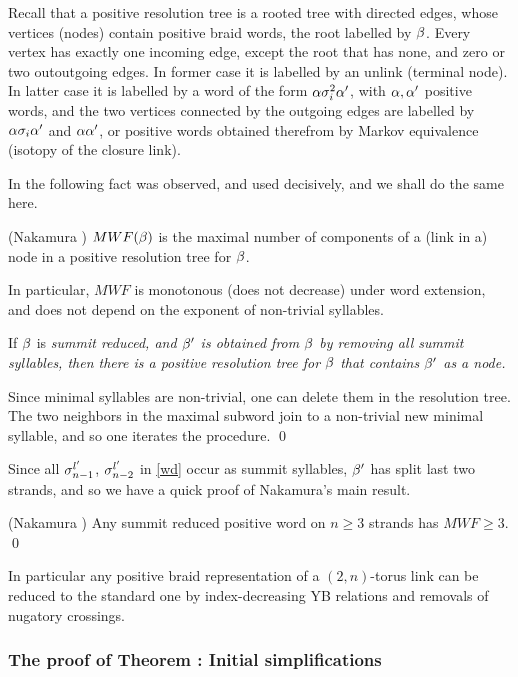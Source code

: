 Recall that a positive resolution tree is a rooted tree with directed 
edges,
whose vertices (nodes) contain positive braid words, the root labelled
by $\beta$. Every vertex has exactly one incoming edge, except the
root that has none, and zero or two outoutgoing edges. In former
case it is labelled by an unlink (terminal node).
In latter case it is labelled by
a word of the form $\alpha\sigma_i^2\alpha'$, with $\alpha,\alpha'$ positive
words, and the two vertices connected by the outgoing edges 
are labelled by $\alpha\sigma_i\alpha'$ and $\alpha\alpha'$, or positive words
obtained therefrom by Markov equivalence (isotopy of the closure link).

In \cite{Nakamura} the following fact was observed, and used
decisively, and we shall do the same here.

\begin{theorem}(Nakamura \cite{Nakamura})
$MWF(\beta)$ is the maximal number of components of a (link in a) node
in a positive resolution tree for $\beta$.
\end{theorem}

In particular, $MWF$ is monotonous (does not decrease) under word
extension, and does not depend on the exponent of non-trivial
syllables.

\begin{lemma}\label{lemh}
If $\beta$ is \em{summit reduced}, and $\beta'$ is obtained from $\beta$
by removing all summit syllables, then there is a positive resolution
tree for $\beta$ that contains $\beta'$ as a node.
\end{lemma}

\proof Since minimal syllables are non-trivial, one can delete them
in the resolution tree. The two neighbors in the maximal subword
join to a non-trivial new minimal syllable, and so one iterates the
procedure. \qed

Since all $\sigma_{n-1}^{l'}$, $\sigma_{n-2}^{l'}$ in \eqref{wd} occur as
summit syllables, $\beta'$ has split last two strands, and so we have
a quick proof of Nakamura's main result.

\begin{corr}(Nakamura \cite{Nakamura})
Any summit reduced positive word on $n\ge 3$ strands has $MWF\ge 3$.
\qed
\end{corr}

In particular any positive braid representation of a $(2,n)$-torus
link can be reduced to the standard one by index-decreasing YB
relations and removals of nugatory crossings.  

\subsubsection{The proof of Theorem :
Initial simplifications\label{4.0}}

